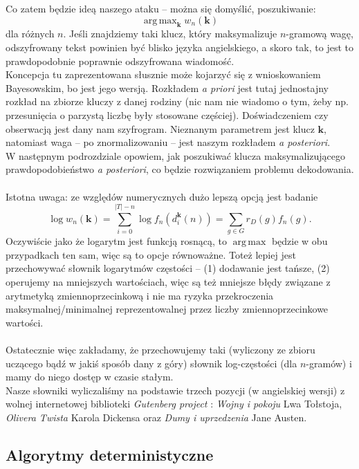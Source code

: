 \documentclass[a4paper]{article}
\DeclareMathOperator*{\argmax}{arg\,max}
\theoremstyle{defn}
\theoremstyle{theorem}
\theoremstyle{lemma}
\theoremstyle{cor}
\theoremstyle{fact}
\begin{document}
Co zatem będzie ideą naszego ataku – można się domyślić, poszukiwanie:
$$ \argmax_{\boldsymbol{k}} w_n(\boldsymbol{k}) $$
dla różnych $n$. Jeśli znajdziemy taki klucz, który maksymalizuje $n$-gramową wagę, odszyfrowany tekst powinien być blisko języka angielskiego, a skoro tak, to jest to prawdopodobnie poprawnie odszyfrowana wiadomość.\\
Koncepcja tu zaprezentowana słusznie może kojarzyć się z wnioskowaniem Bayesowskim, bo jest jego wersją. Rozkładem \textit{a priori} jest tutaj jednostajny rozkład na zbiorze kluczy z danej rodziny (nic nam nie wiadomo o tym, żeby np. przesunięcia o parzystą liczbę były stosowane częściej). Doświadczeniem czy obserwacją jest dany nam szyfrogram. Nieznanym parametrem jest klucz $\boldsymbol{k}$, natomiast waga – po znormalizowaniu – jest naszym rozkładem \textit{a posteriori}.\\
W następnym podrozdziale opowiem, jak poszukiwać klucza maksymalizującego prawdopodobieństwo \textit{a posteriori}, co będzie rozwiązaniem problemu dekodowania.\\\\
Istotna uwaga: ze względów numerycznych dużo lepszą opcją jest badanie $$\log w_n(\boldsymbol{k}) = \sum\limits_{i=0}^{|T|-n} \log f_n(d_i^{\boldsymbol{k}}(n)) = \sum\limits_{g \in G}{r_D(g)} f_n(g).$$
Oczywiście jako że logarytm jest funkcją rosnącą, to $\argmax$ będzie w obu przypadkach ten sam, więc są to opcje równoważne. Toteż lepiej jest przechowywać słownik logarytmów częstości – (1) dodawanie jest tańsze, (2) operujemy na mniejszych wartościach, więc są też mniejsze błędy związane z arytmetyką zmiennoprzecinkową i nie ma ryzyka przekroczenia maksymalnej/minimalnej reprezentowalnej przez liczby zmiennoprzecinkowe wartości.\\\\
Ostatecznie więc zakładamy, że przechowujemy taki (wyliczony ze zbioru uczącego bądź w jakiś sposób dany z góry) słownik log-częstości (dla $n$-gramów) i mamy do niego dostęp w czasie stałym.
\\
Nasze słowniki wyliczaliśmy na podstawie trzech pozycji (w angielskiej wersji) z wolnej internetowej biblioteki \textit{Gutenberg project} \cite{gutenberg}: \textit{Wojny i pokoju} Lwa Tołstoja, \textit{Olivera Twista} Karola Dickensa oraz \textit{Dumy i uprzedzenia} Jane Austen.
\subsection{Algorytmy deterministyczne}
\label{sect4.4}
\end{document}
